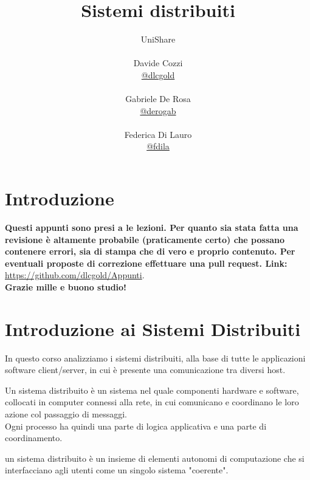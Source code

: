 \documentclass[a4paper,12pt, oneside]{book}
\title{Sistemi distribuiti}
\author{UniShare\\\\Davide Cozzi\\\href{https://t.me/dlcgold}{@dlcgold}\\\\Gabriele De Rosa\\\href{https://t.me/derogab}{@derogab} \\\\Federica Di Lauro\\\href{https://t.me/f_dila}{@f\textunderscore dila}}
\date{}
\begin{document}
\maketitle


\newtheorem{teorema}{Teorema}
\newtheorem{definizione}{Definizione}
\newtheorem{esempio}{Esempio}
\newtheorem{corollario}{Corollario}
\newtheorem{lemma}{Lemma}
\newtheorem{osservazione}{Osservazione}
\newtheorem{nota}{Nota}
\newtheorem{esercizio}{Esercizio}
\tableofcontents
\renewcommand{\chaptermark}[1]{%
\markboth{\chaptername
\ \thechapter.\ #1}{}}
\renewcommand{\sectionmark}[1]{\markright{\thesection.\ #1}}
\chapter{Introduzione}
\textbf{Questi appunti sono presi a le lezioni. Per quanto sia stata fatta una revisione è altamente probabile (praticamente certo) che possano contenere errori, sia di stampa che di vero e proprio contenuto. Per eventuali proposte di correzione effettuare una pull request. Link: } \url{https://github.com/dlcgold/Appunti}.\\
\textbf{Grazie mille e buono studio!}
\chapter{Introduzione ai Sistemi Distribuiti}
In questo corso analizziamo i sistemi distribuiti, alla base di tutte le applicazioni software 
client/server, in cui è presente una comunicazione tra diversi host.

\begin{defi}
Un sistema distribuito è un sistema nel quale componenti hardware e software, collocati in computer
connessi alla rete, in cui comunicano e coordinano le loro azione  col passaggio di messaggi.\\
Ogni processo ha quindi una parte di logica applicativa e una parte di coordinamento. 
\end{defi}

\begin{defi}
un sistema distribuito è un insieme di elementi autonomi di computazione che si 
interfacciano agli utenti come un singolo sistema "coerente".
\end{defi}
\end{document}
